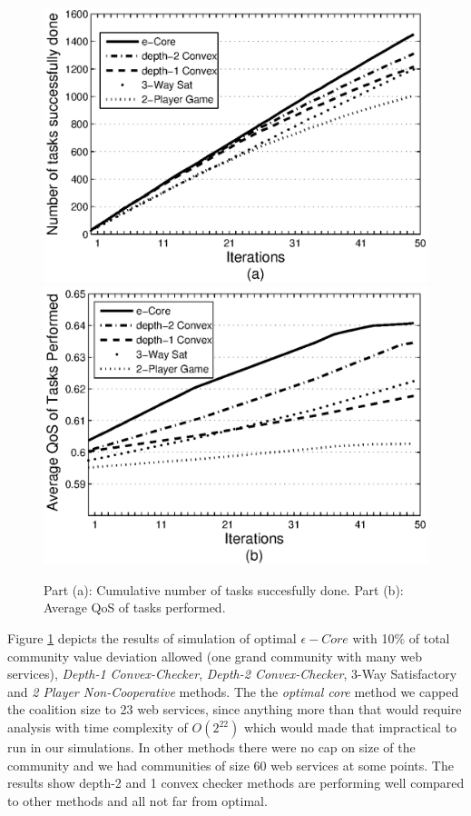 \documentclass[10pt, conference, compsocconf]{IEEEtran}
\theoremstyle{plain}
\theoremstyle{definition}
\begin{document}
\begin{figure}[!t]
\centering
\includegraphics[scale=0.61]{task_done_opt.eps}
\includegraphics[scale=0.61]{task_qos_opt.eps}
\caption{Part (a): Cumulative number of tasks succesfully done. Part
(b): Average QoS of tasks performed.} \label{performanceall}
\end{figure}

Figure \ref{performanceall} depicts the results of simulation of optimal $\epsilon-Core$ with 10\% of total community value deviation allowed (one grand community with many web services), \emph{Depth-1 Convex-Checker}, \emph{Depth-2 Convex-Checker}, 3-Way Satisfactory\cite{DBLP:conf/IEEEscc/LimTMB12} and \emph{2 Player Non-Cooperative} methods. The the \emph{optimal core} method we capped the coalition size to 23 web services, since anything more than that would require analysis with time complexity of $O(2^22)$ which would made that impractical to run in our simulations. In other methods there were no cap on size of the community and we had communities of size 60 web services at some points. The results show depth-2 and 1 convex checker methods are performing well compared to other methods and all not far from optimal.
\end{document}
